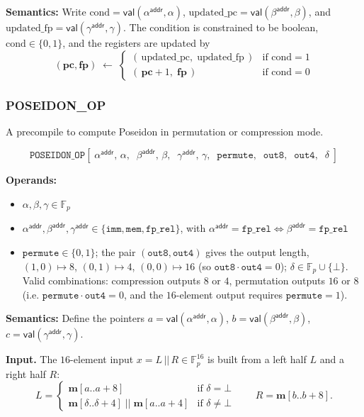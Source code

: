 \documentclass{article}
\theoremstyle{definition}
\newcommand{\Fp}{\mathbb F_p}
\begin{document}
\textbf{Semantics:} Write $\text{cond} = \mathsf{val}(\alpha^\textsf{addr}, \alpha)$, $\text{updated\_pc} = \mathsf{val}(\beta^\textsf{addr}, \beta)$, and $\text{updated\_fp} = \mathsf{val}(\gamma^\textsf{addr}, \gamma)$. The condition is constrained to be boolean, $\text{cond} \in \{0, 1\}$, and the registers are updated by
\[
(\textbf{pc}, \textbf{fp}) \;\gets\;
\begin{cases}
(\,\text{updated\_pc},\; \text{updated\_fp}\,) & \text{if } \text{cond} = 1 \\[2mm]
(\,\textbf{pc} + 1,\; \textbf{fp}\,) & \text{if } \text{cond} = 0
\end{cases}
\]


\subsubsection{POSEIDON\_OP}\label{sec:poseidon-op}

A precompile to compute Poseidon in permutation or compression mode.

\[
\texttt{POSEIDON\_OP}[\;\alpha^\textsf{addr},\, \alpha,\;\; \beta^\textsf{addr},\, \beta,\;\; \gamma^\textsf{addr},\, \gamma,\;\; \texttt{permute},\;\; \texttt{out8},\;\; \texttt{out4},\;\; \delta\;]
\]

\textbf{Operands:}
\begin{itemize}
    \item $\alpha, \beta, \gamma \in \Fp$
    \item $\alpha^\textsf{addr}, \beta^\textsf{addr}, \gamma^\textsf{addr} \in \{\texttt{imm}, \texttt{mem}, \texttt{fp\_rel}\}$, with $\alpha^\textsf{addr} = \texttt{fp\_rel} \Leftrightarrow \beta^\textsf{addr} = \texttt{fp\_rel}$
    \item $\texttt{permute} \in \{0, 1\}$; the pair $(\texttt{out8}, \texttt{out4})$ gives the output length, $(1,0) \mapsto 8$, $(0,1) \mapsto 4$, $(0,0) \mapsto 16$ (so $\texttt{out8}\cdot\texttt{out4} = 0$); $\delta \in \Fp \cup \{\bot\}$. Valid combinations: compression outputs $8$ or $4$, permutation outputs $16$ or $8$ (i.e. $\texttt{permute}\cdot\texttt{out4} = 0$, and the $16$-element output requires $\texttt{permute} = 1$).
\end{itemize}

\textbf{Semantics:} Define the pointers $a = \mathsf{val}(\alpha^\textsf{addr}, \alpha)$, $b = \mathsf{val}(\beta^\textsf{addr}, \beta)$, $c = \mathsf{val}(\gamma^\textsf{addr}, \gamma)$.

\textbf{Input.} The $16$-element input $x = L \,||\, R \in \Fp^{16}$ is built from a left half $L$ and a right half $R$:
\[
L =
\begin{cases}
\textbf{m}[a .. a + 8] & \text{if } \delta = \bot \\[1mm]
\textbf{m}[\delta .. \delta + 4] \;||\; \textbf{m}[a .. a + 4] & \text{if } \delta \neq \bot
\end{cases}
\qquad
R = \textbf{m}[b .. b + 8].
\]
\end{document}
